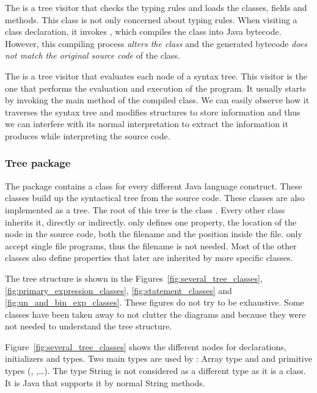 The  is a tree visitor that checks the typing rules and loads the classes, fields and methods. This  class is not only concerned about typing rules. When visiting a class declaration, it invokes , which compiles the class into Java bytecode. However, this compiling process \textit{alters the class} and the generated bytecode \textit{does not match the original source code} of the class.

The  is a tree visitor that evaluates each node of a syntax tree. This visitor is the one that performs the evaluation and execution of the program. It usually starts by invoking the main method of the compiled class. We can easily observe how it traverses the syntax tree and modifies \djava{} structures to store information and thus we can interfere with its normal interpretation to extract the information it produces while interpreting the source code.

\subsubsection{Tree package}
\label{sec:Tree_package}

The  package contains a class for every different Java language construct. These classes build up the syntactical tree from the source code. These classes are also implemented as a
tree. The root of this tree is the class . Every other class inherits it, directly or indirectly.  only defines one property, the location of the node in the source code, both the filename and the position inside the file. \jel{} only accept single file programs, thus the filename is not needed. Most of the other classes also define properties that later are inherited by more specific classes.

The tree structure is shown in the Figures~\ref{fig:several_tree_classes}, \ref{fig:primary_expression_classes}, \ref{fig:statement_classes} and \ref{fig:un_and_bin_exp_classes}. These figures do not try to be exhaustive. Some classes have been taken away to not clutter the diagrams and because they were not needed to understand the
tree structure.

Figure~\ref{fig:several_tree_classes} shows the different nodes for declarations, initializers and types. Two main types are used by \djava{}: Array type and and primitive types (, ,\ldots). The type String is not considered as a different type as it is a class. It is Java that supports it by normal String methods.

